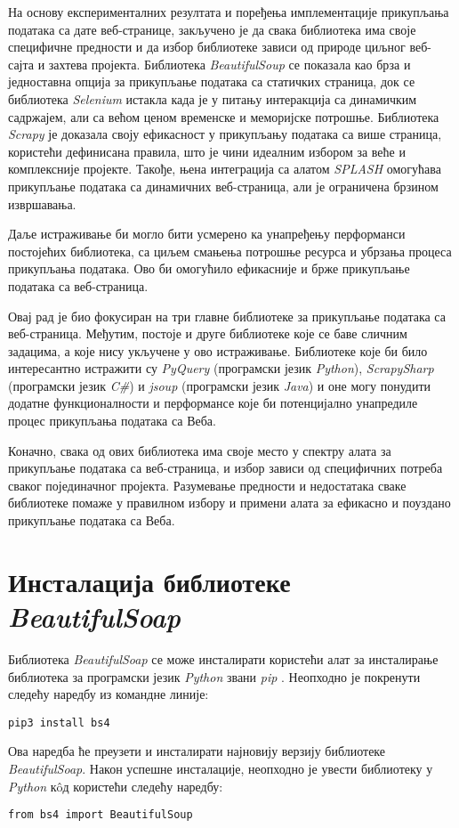 \documentclass[12pt,oneside]{memoir}
\begin{document}
На основу експерименталних резултата и поређења имплементације прикупљања података са дате веб-странице, закључено је да свака библиотека има своје специфичне предности и да избор библиотеке зависи од природе циљног веб-сајта и захтева пројекта. Библиотека \textit{BeautifulSoup} се показала као брза и једноставна опција за прикупљање података са статичких страница, док се библиотека \textit{Selenium} истакла када је у питању интеракција са динамичким садржајем, али са већом ценом временске и меморијске потрошње. Библиотека \textit{Scrapy} је доказала своју ефикасност у прикупљању података са више страница, користећи дефинисана правила, што је чини идеалним избором за веће и комплексније пројекте. Такође, њена интеграција са алатом \textit{SPLASH} омогућава прикупљање података са динамичних веб-страница, али је ограничена брзином извршавања.

Даље истраживање би могло бити усмерено ка унапређењу перформанси постојећих библиотека, са циљем смањења потрошње ресурса и убрзања процеса прикупљања података. Ово би омогућило ефикасније и брже прикупљање података са веб-страница.

Овај рад је био фокусиран на три главне библиотеке за прикупљање података са веб-страница. Међутим, постоје и друге библиотеке које се баве сличним задацима, а које нису укључене у ово истраживање. Библиотеке које би било интересантно истражити су \textit{PyQuery} \cite{pyquery} (програмски језик \textit{Python}), \textit{ScrapySharp} \cite{scrapySharp} (програмски језик \textit{C\#}) и \textit{jsoup} \cite{jsoup} (програмски језик \textit{Java}) и оне могу понудити додатне функционалности и перформансе које би потенцијално унапредиле процес прикупљања података са Веба.

Коначно, свака од ових библиотека има своје место у спектру алата за прикупљање података са веб-страница, и избор зависи од специфичних потреба сваког појединачног пројекта. Разумевање предности и недостатака сваке библиотеке помаже у правилном избору и примени алата за ефикасно и поуздано прикупљање података са Веба.

\appendix
\addappheadtotoc

\chapter{Инсталација библиотеке \textit{BeautifulSoap}}
\label{app:instalacijaBeautifulSoap}
Библиотека \textit{BeautifulSoap} се може инсталирати користећи алат за инсталирање библиотека за програмски језик \textit{Python} звани \textit{pip} \cite{pip}. Неопходно је покренути следећу наредбу из командне линије:
\begin{verbatim}
pip3 install bs4
\end{verbatim}
Ова наредба ће преузети и инсталирати најновију верзију библиотеке \\ \textit{BeautifulSoap}. Након успешне инсталације, неопходно је увести библиотеку у \textit{Python} кôд користећи следећу наредбу:
\begin{verbatim}
from bs4 import BeautifulSoup
\end{verbatim}
\end{document}
